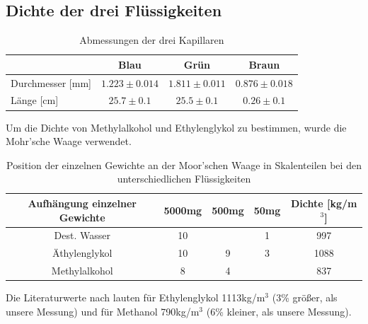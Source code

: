 \documentclass[12pt,a4paper,titlepage,headinclude,bibtotoc]{scrartcl}
\begin{document}
\subsection{Dichte der drei Flüssigkeiten}
\begin{table}[!h]
\centering
\begin{tabular}{|l|c|c|c|}
\hline
 & Blau & Grün & Braun\\\hline
Durchmesser [mm]&$1.223\pm 0.014$&$1.811\pm 0.011$&$0.876\pm 0.018$\\\hline
Länge [cm]&$25.7\pm 0.1$&$ 25.5\pm 0.1$&$0.26\pm 0.1$\\\hline
\end{tabular}
\caption{Abmessungen der drei Kapillaren}
\end{table}
Um die Dichte von Methylalkohol und Ethylenglykol zu bestimmen, wurde die Mohr'sche Waage verwendet.
\begin{table}
\centering
\begin{tabular}{|c|c|c|c|c|}
\hline Aufhängung einzelner Gewichte & 5000mg & 500mg & 50mg &Dichte [kg/m$^3$]\\
\hline Dest. Wasser  & 10	&	& 1	& 997	\\
\hline Äthylenglykol & 10	& 9	& 3	& 1088	\\
\hline Methylalkohol & 8	& 4	& 	& 837	\\\hline
\end{tabular}
\caption{Position der einzelnen Gewichte an der Moor'schen Waage in Skalenteilen bei den unterschiedlichen Flüssigkeiten\label{tab:dichte}}
\end{table}
Die Literaturwerte nach \cite[S. 130-131]{Formelsammlung} lauten für Ethylenglykol 1113kg/m$^3$ (3\% größer, als unsere Messung) und für Methanol 790kg/m$^3$ (6\% kleiner, als unsere Messung).
\end{document}
